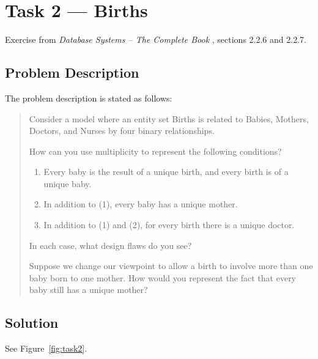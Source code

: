 %
%
%


\section{Task 2 --- Births}
Exercise from \emph{Database Systems -- The Complete Book} \cite{2dv513:dbs},
sections 2.2.6 and 2.2.7.

\subsection{Problem Description}
The problem description \cite{2dv513:assignment1-instructions} is stated as
follows:

\begin{quote}
  Consider a model where an entity set Births is related to Babies, Mothers,
  Doctors, and Nurses by four binary relationships.

  How can you use multiplicity to represent the following conditions?

  \begin{enumerate}
    \item
      Every baby is the result of a unique birth, and every birth is of a
      unique baby.
    \item
      In addition to (1), every baby has a unique mother.
    \item
      In addition to (1) and (2), for every birth there is a unique doctor.
  \end{enumerate}

  In each case, what design flaws do you see?

  Suppose we change our viewpoint to allow a birth to involve more than one
  baby born to one mother.
  How would you represent the fact that every baby still has a unique mother?
\end{quote}


\subsection{Solution}
See Figure~\ref{fig:task2}.



